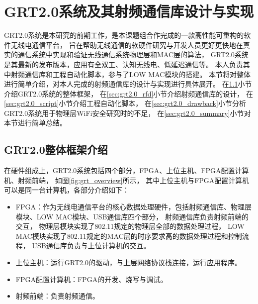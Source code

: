 
\chapter{GRT2.0系统及其射频通信库设计与实现}\label{chap:grt2.0}
	GRT2.0系统是本研究的前期工作，是本课题组合作完成的一款高性能可重构的软件无线电通信平台\cite{pkuraw}，
	旨在帮助无线通信的软硬件研究与开发人员更好更快地在真实的通信系统中实现和验证无线通信系统物理层和MAC层的算法，
	GRT2.0系统是其最新的发布版本，应用有全双工\cite{mna16grt}、认知无线电\cite{fpga17grt}、低延迟通信等。
	本人负责其中射频通信库和工程自动化脚本，参与了LOW MAC模块的搭建。
	本节将对整体进行简单介绍，对本人完成的射频通信库的设计与实现进行具体展开。
	在\ref{sec:grt2.0_overview}小节介绍GRT2.0系统的整体框架，
	在\ref{sec:grt2.0_rfd}小节介绍射频通信库的设计，
	在\ref{sec:grt2.0_script}小节介绍工程自动化脚本，
	在\ref{sec:grt2.0_drawback}小节分析GRT2.0系统用于物理层WiFi安全研究时的不足，
	在\ref{sec:grt2.0_summary}小节对本节进行简单总结。

	\section{GRT2.0整体框架介绍}\label{sec:grt2.0_overview}
	在硬件组成上，GRT2.0系统包括四个部分，FPGA、上位主机、FPGA配置计算机、射频前端，
	如图\ref{fig:grt_overview}所示，
	其中上位主机与FPGA配置计算机可以是同一台计算机，各部分介绍如下：
		\begin{itemize}
			\item FPGA：作为无线电通信平台的核心数据处理硬件，包括射频通信库、物理层模块、LOW MAC模块、USB通信库四个部分，
			射频通信库负责射频前端的交互，
			物理层模块实现了802.11规定的物理层全部的数据处理过程，
			LOW MAC模块实现了802.11规定的MAC层的时序要求高的数据处理过程和控制流程，
			USB通信库负责与上位计算机的交互。
			\item 上位主机：运行GRT2.0的驱动，与上层网络协议栈连接，运行应用程序。
			\item FPGA配置计算机：FPGA的开发、烧写与调试。
			\item 射频前端：负责射频通信。
		\end{itemize}

